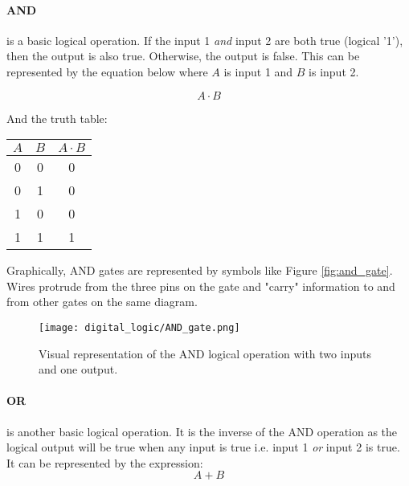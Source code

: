     \paragraph*{AND} is a basic logical operation.
    If the input 1 \textit{and} input 2 are both true (logical '1'), then the output is also true.
    Otherwise, the output is false.
    This can be represented by the equation below where $A$ is input 1 and $B$ is input 2.

    \begin{equation*}
        A \cdot B
    \end{equation*}

    And the truth table:
    \begin{table}[h!]
        \begin{tabular}{c c | c}
            \toprule
            $A$ & $B$ & $A \cdot B$  \\
            \midrule
             0  &  0  &    0    \\
             0  &  1  &    0    \\
             1  &  0  &    0    \\
             1  &  1  &    1    \\
            \bottomrule
        \end{tabular}
    \end{table}

    Graphically, AND gates are represented by symbols like Figure \ref{fig:and_gate}.
    Wires protrude from the three pins on the gate and "carry" information to and from other gates on the same diagram.
    \begin{figure}[h!]
        \texttt{[image: digital\_logic/AND\_gate.png]}
        \caption[AND Gate]{Visual representation of the AND logical operation with two inputs and one output.}
    \end{figure}

    \paragraph*{OR} is another basic logical operation.
    It is the inverse of the AND operation as the logical output will be true when any input is true i.e. input 1 \textit{or} input 2 is true.
    It can be represented by the expression:
    \begin{equation*}
        A + B
    \end{equation*}

